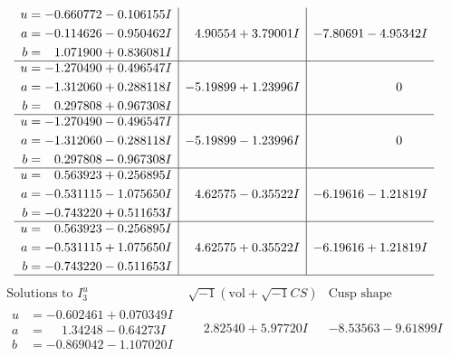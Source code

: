 \documentclass[1p]{elsarticle_modified}
\theoremstyle{definition}
\newcommand{\I}{\sqrt{-1}}
\begin{document}
$$\begin{array}{c|c|c}
\begin{aligned}
u &= -0.660772 - 0.106155 I \\
a &= -0.114626 - 0.950462 I \\
b &= \phantom{-}1.071900 + 0.836081 I\end{aligned}
 & \phantom{-}4.90554 + 3.79001 I & -7.80691 - 4.95342 I \\ \hline\begin{aligned}
u &= -1.270490 + 0.496547 I \\
a &= -1.312060 + 0.288118 I \\
b &= \phantom{-}0.297808 + 0.967308 I\end{aligned}
 & -5.19899 + 1.23996 I & \phantom{-0.000000 } 0 \\ \hline\begin{aligned}
u &= -1.270490 - 0.496547 I \\
a &= -1.312060 - 0.288118 I \\
b &= \phantom{-}0.297808 - 0.967308 I\end{aligned}
 & -5.19899 - 1.23996 I & \phantom{-0.000000 } 0 \\ \hline\begin{aligned}
u &= \phantom{-}0.563923 + 0.256895 I \\
a &= -0.531115 - 1.075650 I \\
b &= -0.743220 + 0.511653 I\end{aligned}
 & \phantom{-}4.62575 - 0.35522 I & -6.19616 - 1.21819 I \\ \hline\begin{aligned}
u &= \phantom{-}0.563923 - 0.256895 I \\
a &= -0.531115 + 1.075650 I \\
b &= -0.743220 - 0.511653 I\end{aligned}
 & \phantom{-}4.62575 + 0.35522 I & -6.19616 + 1.21819 I\\
 \hline 
 \end{array}$$\newpage$$\begin{array}{c|c|c}  
\text{Solutions to }I^u_{3}& \I (\text{vol} + \sqrt{-1}CS) & \text{Cusp shape}\\
 \hline 
\begin{aligned}
u &= -0.602461 + 0.070349 I \\
a &= \phantom{-}1.34248 - 0.64273 I \\
b &= -0.869042 - 1.107020 I\end{aligned}
 & \phantom{-}2.82540 + 5.97720 I & -8.53563 - 9.61899 I \\ \hline\begin{aligned}

\end{aligned}
\end{array}$$
\end{document}
